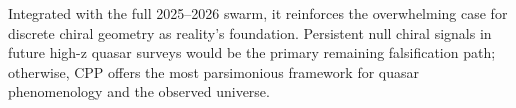 \documentclass[11pt]{article}
\begin{document}
Integrated with the full 2025--2026 swarm, it reinforces the overwhelming case for discrete chiral geometry as reality's foundation. Persistent null chiral signals in future high-z quasar surveys would be the primary remaining falsification path; otherwise, CPP offers the most parsimonious framework for quasar phenomenology and the observed universe.
\end{document}
